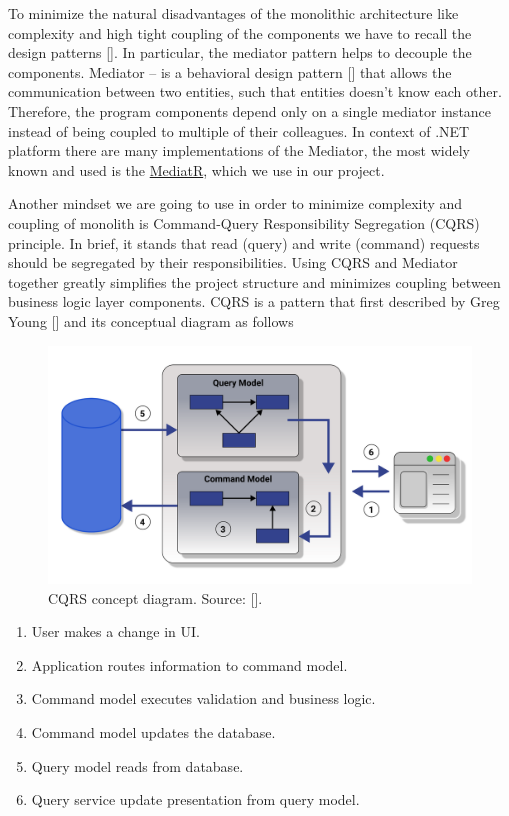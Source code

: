 To minimize the natural disadvantages of the monolithic architecture like complexity and high tight coupling of the components
we have to recall the design patterns [\cite{rising1998design}].
In particular, the mediator pattern helps to decouple the components.
Mediator -- is a behavioral design pattern [\cite{rasche2016building}] that allows the communication between two entities,
such that entities doesn't know each other.
Therefore, the program components depend only on a single mediator instance instead of being coupled to multiple of their
colleagues.
In context of .NET platform there are many implementations of the Mediator, the most widely known and used is the
\href{https://github.com/jbogard/MediatR}{MediatR}, which we use in our project.

Another mindset we are going to use in order to minimize complexity and coupling of monolith is Command-Query
Responsibility Segregation (CQRS) principle.
In brief, it stands that read (query) and write (command) requests should be segregated by their responsibilities.
Using CQRS and Mediator together greatly simplifies the project structure and minimizes coupling between business
logic layer components.
CQRS is a pattern that first described by Greg Young [\cite{young2010cqrs}] and its conceptual diagram as follows

\begin{figure}[H]
    \centering
    \includegraphics[width=1\textwidth]{Pictures/05_CQRS_concept_diagram}
    \caption{CQRS concept diagram. Source: [\cite{fowler2011cqrs}].}
    \label{fig:figure}
\end{figure}

\begin{enumerate}
    \item User makes a change in UI\@.
    \item Application routes information to command model.
    \item Command model executes validation and business logic.
    \item Command model updates the database.
    \item Query model reads from database.
    \item Query service update presentation from query model.
\end{enumerate}
